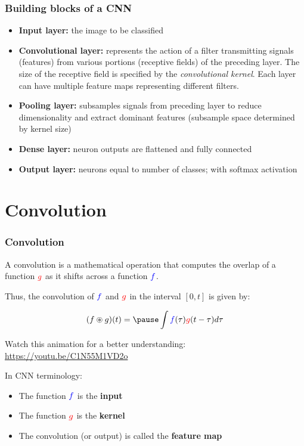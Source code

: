 \documentclass[smaller]{beamer}
\begin{document}
\begin{frame}
  \frametitle{Building blocks of a CNN}
  \pause
  \begin{itemize}[<+->]
  \item \textbf{Input layer:} the image to be classified 
  \item \textbf{Convolutional layer:} represents the action of a filter transmitting signals (features) from various
    portions (receptive fields) of the preceding layer. The size of the receptive field is specified by the
    \textit{convolutional kernel}. Each layer can have multiple feature maps representing different filters.
  \item \textbf{Pooling layer:} subsamples signals from preceding layer to reduce dimensionality and extract dominant
    features (subsample space determined by kernel size)
  \item \textbf{Dense layer:} neuron outputs are flattened and fully connected %
  \item \textbf{Output layer:} neurons equal to number of classes; with softmax activation
  \end{itemize}

  
\end{frame}

\section{Convolution}
\begin{frame}
  \frametitle{Convolution}
  \pause
  A convolution is a mathematical operation that computes the  overlap of a function $\color{red} g$ as it shifts across a function $\color{blue} f$. \pause

  \medskip
  
  Thus, the convolution of $\color{blue} f$ and $\color{red} g$ in the interval $[0,t]$ is given by: \pause
  
  \begin{equation}
    (f\circledast g)(t) =\pause \int {\bl f}(\tau){\rd g} (t - \tau)d\tau
  \end{equation}
  \pause

  Watch this animation for a better understanding: \url{https://youtu.be/C1N55M1VD2o}

  \bigskip
  
  In CNN terminology: \pause
  \begin{itemize}
  \item The function $\color{blue} f$ is the \textbf{\bl input}
  \item The function $\color{red} g$ is the \textbf{\rd kernel}
  \item The convolution (or output) is called the \textbf{\pl feature map}
  \end{itemize}
\end{frame}
\end{document}
